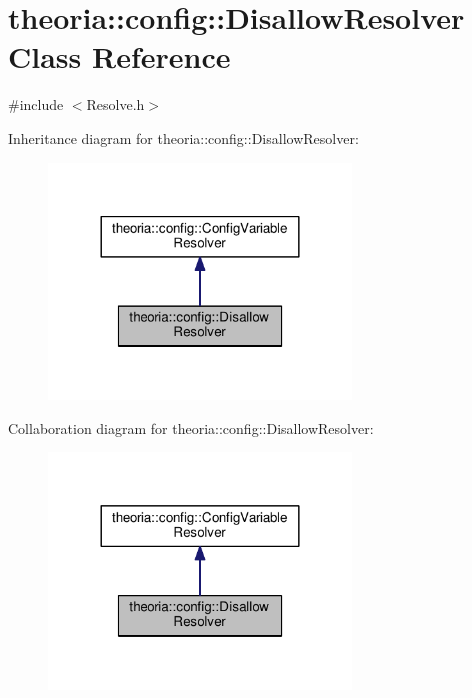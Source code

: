 \hypertarget{classtheoria_1_1config_1_1DisallowResolver}{}\section{theoria\+:\+:config\+:\+:Disallow\+Resolver Class Reference}
\label{classtheoria_1_1config_1_1DisallowResolver}


{\ttfamily \#include $<$Resolve.\+h$>$}



Inheritance diagram for theoria\+:\+:config\+:\+:Disallow\+Resolver\+:\nopagebreak
\begin{figure}[H]
\begin{center}
\leavevmode
\includegraphics[width=228pt]{classtheoria_1_1config_1_1DisallowResolver__inherit__graph}
\end{center}
\end{figure}


Collaboration diagram for theoria\+:\+:config\+:\+:Disallow\+Resolver\+:\nopagebreak
\begin{figure}[H]
\begin{center}
\leavevmode
\includegraphics[width=228pt]{classtheoria_1_1config_1_1DisallowResolver__coll__graph}
\end{center}
\end{figure}
